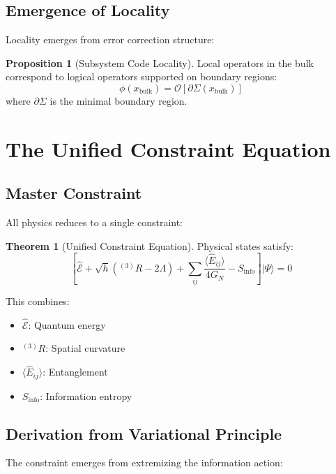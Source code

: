 \documentclass[11pt,a4paper]{article}
\theoremstyle{definition}
\newtheorem{theorem}{Theorem}[section]
\newtheorem{proposition}{Proposition}[section]
\begin{document}
\subsection{Emergence of Locality}

Locality emerges from error correction structure:

\begin{proposition}[Subsystem Code Locality]
Local operators in the bulk correspond to logical operators supported on boundary regions:
\[\phi(x_{\text{bulk}}) = \mathcal{O}[\partial\Sigma(x_{\text{bulk}})]\]
where $\partial\Sigma$ is the minimal boundary region.
\end{proposition}

\section{The Unified Constraint Equation}

\subsection{Master Constraint}

All physics reduces to a single constraint:

\begin{theorem}[Unified Constraint Equation]
Physical states satisfy:
\begin{equation}
\boxed{\left[\hat{\mathcal{E}} + \sqrt{h}({}^{(3)}R - 2\Lambda) + \sum_{ij}\frac{\langle\hat{E}_{ij}\rangle}{4G_N} - S_{\text{info}}\right]|\Psi\rangle = 0}
\end{equation}
\end{theorem}

This combines:
\begin{itemize}
\item $\hat{\mathcal{E}}$: Quantum energy
\item ${}^{(3)}R$: Spatial curvature
\item $\langle\hat{E}_{ij}\rangle$: Entanglement
\item $S_{\text{info}}$: Information entropy
\end{itemize}

\subsection{Derivation from Variational Principle}

The constraint emerges from extremizing the information action:
\end{document}
